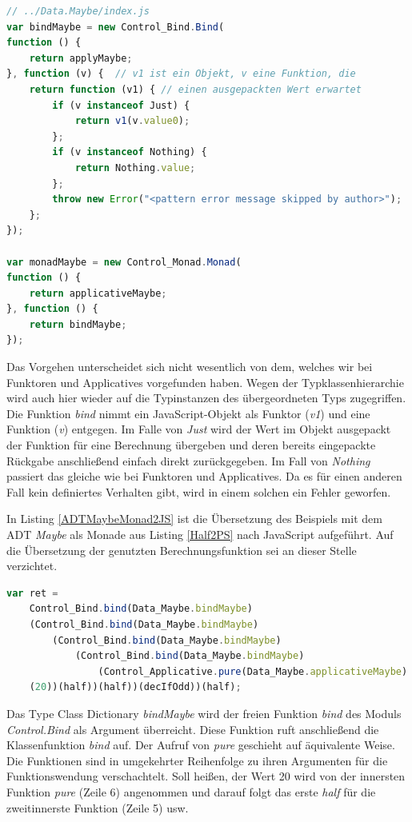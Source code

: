 \documentclass[
12pt,
ngerman,
oneside]
{scrbook} %
\begin{document}
\begin{lstlisting}[language=javascript, style=numbered-and-boxed, caption=Übersetzung der Typinstanzen für \emph{Maybe}, label=ADTMaybeMonadJS]
// ../Data.Maybe/index.js
var bindMaybe = new Control_Bind.Bind(
function () {
	return applyMaybe;
}, function (v) {  // v1 ist ein Objekt, v eine Funktion, die
	return function (v1) { // einen ausgepackten Wert erwartet
		if (v instanceof Just) {
			return v1(v.value0);
		};
		if (v instanceof Nothing) {
			return Nothing.value;
		};
		throw new Error("<pattern error message skipped by author>");
	};
});

var monadMaybe = new Control_Monad.Monad(
function () {
	return applicativeMaybe;
}, function () {
	return bindMaybe;
});
\end{lstlisting}

Das Vorgehen unterscheidet sich nicht wesentlich von dem, welches wir bei Funktoren und Applicatives vorgefunden haben. Wegen der Typklassenhierarchie wird auch hier wieder auf die Typinstanzen des übergeordneten Typs zugegriffen. Die Funktion \emph{bind} nimmt ein JavaScript-Objekt als Funktor (\emph{v1}) und eine Funktion (\emph{v}) entgegen. Im Falle von \emph{Just} wird der Wert im Objekt ausgepackt der Funktion für eine Berechnung übergeben und deren bereits eingepackte Rückgabe anschließend einfach direkt zurückgegeben. Im Fall von \emph{Nothing} passiert das gleiche wie bei Funktoren und Applicatives. Da es für einen anderen Fall kein definiertes Verhalten gibt, wird in einem solchen ein Fehler geworfen.

In Listing \ref{ADTMaybeMonad2JS} ist die Übersetzung des Beispiels mit dem ADT \emph{Maybe} als Monade aus Listing \ref{Half2PS} nach JavaScript aufgeführt. Auf die Übersetzung der genutzten Berechnungsfunktion sei an dieser Stelle verzichtet.
\begin{lstlisting}[language=javascript, style=numbered-and-boxed, caption=Übersetzung von Monaden mit Maybe nach JS, label=ADTMaybeMonad2JS]
var ret =
	Control_Bind.bind(Data_Maybe.bindMaybe)
	(Control_Bind.bind(Data_Maybe.bindMaybe)
		(Control_Bind.bind(Data_Maybe.bindMaybe)
			(Control_Bind.bind(Data_Maybe.bindMaybe)
				(Control_Applicative.pure(Data_Maybe.applicativeMaybe)
	(20))(half))(half))(decIfOdd))(half);
\end{lstlisting}

Das Type Class Dictionary \emph{bindMaybe} wird der freien Funktion \emph{bind} des Moduls \emph{Control.Bind} als Argument überreicht. Diese Funktion ruft anschließend die Klassenfunktion \emph{bind} auf. Der Aufruf von \emph{pure} geschieht auf äquivalente Weise. Die Funktionen sind in umgekehrter Reihenfolge zu ihren Argumenten für die Funktionswendung verschachtelt. Soll heißen, der Wert 20 wird von der innersten Funktion \emph{pure} (Zeile 6) angenommen und darauf folgt das erste \emph{half} für die zweitinnerste Funktion (Zeile 5) usw.
\end{document}
